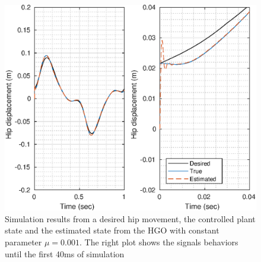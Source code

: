 \documentclass[letterpaper, 10 pt, journal, twocolumn]{IEEEtran}  %
\theoremstyle{plain}
\theoremstyle{definition}
\theoremstyle{remark}
\begin{document}
%
%
%
%
%
%
%
%
%
\begin{figure}[h!]
	\begin{center}
	\includegraphics[width = \columnwidth]{Figs/q_hip_mu_1e-03.eps}
	\caption{ Simulation results from a desired hip movement, the controlled plant state and the estimated state from the HGO with constant parameter $\mu=0.001$. The right plot shows the signals behaviors until the first 40ms of simulation}
	\label{fig:hip}
	\end{center}
\end{figure}
%
%
\end{document}

